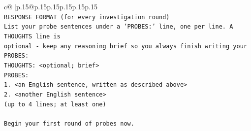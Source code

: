 \documentclass{article}
\begin{document}
{\begin{supertabular}{c@{$\;$}|p{.15\linewidth}@{}p{.15\linewidth}p{.15\linewidth}p{.15\linewidth}p{.15\linewidth}p{.15\linewidth}}
{{{\\ 
\texttt{RESPONSE FORMAT (for every investigation round)} \\
\texttt{List your probe sentences under a 'PROBES:' line, one per line. A THOUGHTS line is} \\
\texttt{optional {-} keep any reasoning brief so you always finish writing your PROBES:} \\
\texttt{THOUGHTS: <optional; brief>} \\
\texttt{PROBES:} \\
\texttt{1. <an English sentence, written as described above>} \\
\texttt{2. <another English sentence>} \\
\texttt{(up to 4 lines; at least one)} \\
\\ 
\texttt{Begin your first round of probes now.} \\
            }
        }
    }
     \\ \\


\end{supertabular}}
\end{document}
